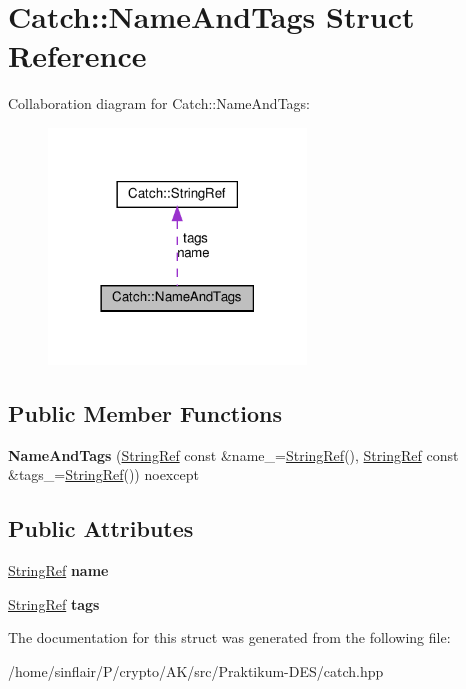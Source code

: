 \hypertarget{structCatch_1_1NameAndTags}{}\section{Catch\+:\+:Name\+And\+Tags Struct Reference}
\label{structCatch_1_1NameAndTags}


Collaboration diagram for Catch\+:\+:Name\+And\+Tags\+:
\nopagebreak
\begin{figure}[H]
\begin{center}
\leavevmode
\includegraphics[width=194pt]{structCatch_1_1NameAndTags__coll__graph}
\end{center}
\end{figure}
\subsection*{Public Member Functions}
\begin{DoxyCompactItemize}
\item 
\mbox{\label{structCatch_1_1NameAndTags_ab585111e615ce8c504a2b9630de8ee94}} 
{\bfseries Name\+And\+Tags} (\hyperlink{classCatch_1_1StringRef}{String\+Ref} const \&name\+\_\+=\hyperlink{classCatch_1_1StringRef}{String\+Ref}(), \hyperlink{classCatch_1_1StringRef}{String\+Ref} const \&tags\+\_\+=\hyperlink{classCatch_1_1StringRef}{String\+Ref}()) noexcept
\end{DoxyCompactItemize}
\subsection*{Public Attributes}
\begin{DoxyCompactItemize}
\item 
\mbox{\label{structCatch_1_1NameAndTags_a7cbea60e0cebfa622c667008eb011420}} 
\hyperlink{classCatch_1_1StringRef}{String\+Ref} {\bfseries name}
\item 
\mbox{\label{structCatch_1_1NameAndTags_a74062ed1138834a348424eb7ed900c57}} 
\hyperlink{classCatch_1_1StringRef}{String\+Ref} {\bfseries tags}
\end{DoxyCompactItemize}


The documentation for this struct was generated from the following file\+:\begin{DoxyCompactItemize}
\item 
/home/sinflair/\+P/crypto/\+A\+K/src/\+Praktikum-\/\+D\+E\+S/catch.\+hpp\end{DoxyCompactItemize}
